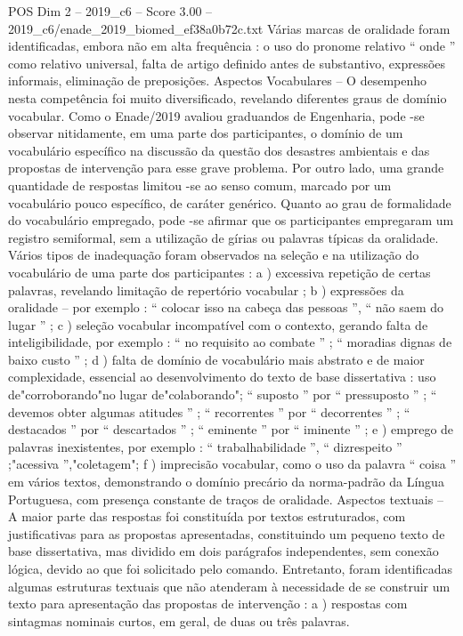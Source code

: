 \begin{textsample}{POS Dim 2 – 2019\_c6 – Score 3.00 – 2019\_c6/enade\_2019\_biomed\_ef38a0b72c.txt}
Várias marcas de oralidade foram identificadas, embora não em alta frequência : o uso do pronome relativo “ onde ” como relativo universal, falta de artigo definido antes de substantivo, expressões informais, eliminação de preposições.
Aspectos Vocabulares – O desempenho nesta competência foi muito diversificado, revelando diferentes graus de domínio vocabular.
Como o Enade/2019 avaliou graduandos de Engenharia, pode -se observar nitidamente, em uma parte dos participantes, o domínio de um vocabulário específico na discussão da questão dos desastres ambientais e das propostas de intervenção para esse grave problema.
Por outro lado, uma grande quantidade de respostas limitou -se ao senso comum, marcado por um vocabulário pouco específico, de caráter genérico.
Quanto ao grau de formalidade do vocabulário empregado, pode -se afirmar que os participantes empregaram um registro semiformal, sem a utilização de gírias ou palavras típicas da oralidade.
Vários tipos de inadequação foram observados na seleção e na utilização do vocabulário de uma parte dos participantes : a ) excessiva repetição de certas palavras, revelando limitação de repertório vocabular ; b ) expressões da oralidade – por exemplo : “ colocar isso na cabeça das pessoas ”, “ não saem do lugar ” ; c ) seleção vocabular incompatível com o contexto, gerando falta de inteligibilidade, por exemplo : “ no requisito ao combate ” ; “ moradias dignas de baixo custo ” ; d ) falta de domínio de vocabulário mais abstrato e de maior complexidade, essencial ao desenvolvimento do texto de base dissertativa : uso de"corroborando"no lugar de"colaborando"; “ suposto ” por “ pressuposto ” ; “ devemos obter algumas atitudes ” ; “ recorrentes ” por “ decorrentes ” ; “ destacados ” por “ descartados ” ; “ eminente ” por “ iminente ” ; e ) emprego de palavras inexistentes, por exemplo : “ trabalhabilidade ”, “ dizrespeito ” ;"acessiva ”,"coletagem"; f ) imprecisão vocabular, como o uso da palavra “ coisa ” em vários textos, demonstrando o domínio precário da norma-padrão da Língua Portuguesa, com presença constante de traços de oralidade.
Aspectos textuais – A maior parte das respostas foi constituída por textos estruturados, com justificativas para as propostas apresentadas, constituindo um pequeno texto de base dissertativa, mas dividido em dois parágrafos independentes, sem conexão lógica, devido ao que foi solicitado pelo comando.
Entretanto, foram identificadas algumas estruturas textuais que não atenderam à necessidade de se construir um texto para apresentação das propostas de intervenção : a ) respostas com sintagmas nominais curtos, em geral, de duas ou três palavras.

\end{textsample}
